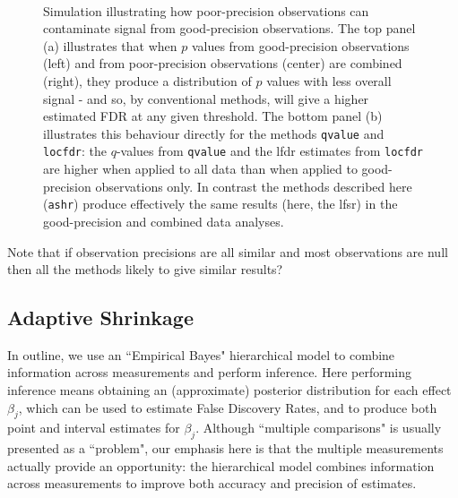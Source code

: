 \documentclass[11pt]{article}
\def\shat{\hat{s}}
\def\qvalue{{\tt qvalue}\xspace}
\def\locfdr{{\tt locfdr}\xspace}
\def\ashr{{\tt ashr}\xspace}
\begin{document}
\begin{figure}
\centering
{} \\
\caption{Simulation illustrating how poor-precision observations can contaminate signal from good-precision observations. The top panel (a) illustrates that when 
$p$ values from good-precision observations (left) and from poor-precision observations (center) are combined (right), they produce
a distribution of $p$ values with less overall signal - and so, by conventional methods, will give a higher estimated FDR at any given threshold.
The bottom panel (b) illustrates this behaviour directly for the methods \qvalue and \locfdr: the $q$-values from \qvalue and the lfdr estimates from \locfdr are higher when applied to all data than when applied to good-precision observations only. In contrast the methods described here (\ashr) produce effectively the same results (here, the lfsr) in the good-precision and combined data analyses.} \label{fig:goodpoor}
\end{figure}


Note that if observation precisions are all similar and most observations are null then all the methods likely to give similar results?

 \subsection*{Adaptive Shrinkage}
 
 
 In outline, we use an ``Empirical Bayes" hierarchical model to combine information across measurements and perform inference.
 Here performing inference means obtaining an (approximate) posterior distribution for each effect $\beta_j$,
which can be used to estimate False Discovery Rates, and to produce both point and interval estimates for $\beta_j$.
 Although ``multiple comparisons" is usually presented as a ``problem", our emphasis here is that the multiple measurements
 actually provide an opportunity: the hierarchical model combines information across measurements to improve both accuracy and precision of estimates. 
 
\end{document}
